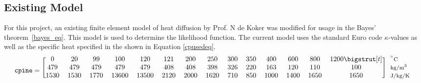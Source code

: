 %
%
%	
%	
	\subsection{Existing Model}
	For this project, an existing finite element model of heat diffusion by Prof. N de Koker was modified for usage in the Bayes' theorem~\ref{bayes_eq}. 
	This model is used to determine the likelihood function. 
	The current model uses the standard Euro code $\kappa$-values as well as the specific heat specified in the \citep{Euro:2004} shown in Equation \ref{cpusedeq}.
\begin{equation} \label{cpusedeq}
\centering
  \texttt{cpine}=
  \begin{blockarray}{*{14}{c} l}
    \begin{block}{[*{14}{c}]>{$\footnotesize}l<{$}}
      0 & 20 & 99&100& 120 & 121 & 200 & 250 & 300 & 350 & 400 & 600& 800 & 1200 \bigstrut[t]& $^{^\circ}\text{C}$ \\
      479 & 479& 479 & 479 &  479 & 408 & 408 & 398 & 326&  220 &163 &  120 & 110 & 100 & $\text{kg/m}^3$ \\
     1530 &1530 &1770 &13600& 13500& 2120& 2000& 1620 & 710 & 850 &1000& 1400 &1650& 1650 & J/kg/K \\
    \end{block}
  \end{blockarray}
\end{equation}
	

